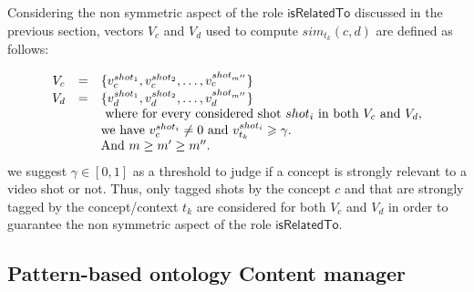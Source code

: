 		Considering the non symmetric aspect of the role $\mathsf{isRelatedTo}$ discussed in the previous section, 
		vectors $V_{c}$ and $V_{d}$ used to compute $sim_{t_{k}}(c, d)$ are defined as follows:
		
		\begin{equation}
			\label{eq4}
			\begin{array}{ c c l }
			V_{c} & = & \{v^{shot_{1}}_{c},v^{shot_{2}}_{c}, \dots,
			v^{shot_{m''}}_{c}\}\\
			V_{d} & = & 
			\{v^{shot_{1}}_{d},v^{shot_{2}}_{d}, \dots, v^{shot_{m''}}_{d}\}\\
			& & \text{ where for every considered shot } shot_{i} \text{ in both } V_{c} \text{ and } V_{d},\\
			& &  \text{we have } v^{shot_{i}}_{c}\neq 0 \text{ and } v^{shot_{i}}_{t_{k}}
			\geqslant \gamma.\\
			& & \text{And } m \geq m' \geq m''.
			\end{array}
		\end{equation}
		we suggest $\gamma \in [0,1]$  as a threshold to judge if a concept is strongly relevant 
		to a video shot or not. Thus, only tagged shots by the concept $c$ and that are strongly 
		tagged by the concept/context $t_{k}$ are considered for both $V_{c}$ and $V_{d}$ in order to guarantee 
		the non symmetric aspect of the role $\mathsf{isRelatedTo}$.
		
		\subsection{Pattern-based ontology Content manager}
		
